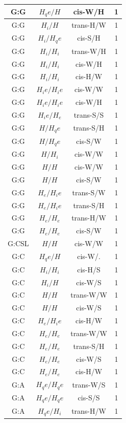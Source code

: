 \begin{center}
\begin{longtable}{c|c|c|c}
G:G & $H_qe/H$ & cis-W/H & 1 \\  \hline
G:G & $H_i/H$ & trans-H/W & 1 \\  \hline
G:G & $H_i/H_qe$ & cis-S/H & 1 \\  \hline
G:G & $H_i/H_i$ & trans-W/H & 1 \\  \hline
G:G & $H_i/H_i$ & cis-W/H & 1 \\  \hline
G:G & $H_i/H_i$ & cis-H/W & 1 \\  \hline
G:G & $H_ie/H_ie$ & cis-W/W & 1 \\  \hline
G:G & $H_ie/H_ie$ & cis-W/H & 1 \\  \hline
G:G & $H_ie/H_e$ & trans-S/S & 1 \\  \hline
G:G & $H/H_qe$ & trans-S/H & 1 \\  \hline
G:G & $H/H_qe$ & cis-S/W & 1 \\  \hline
G:G & $H/H_i$ & cis-W/W & 1 \\  \hline
G:G & $H/H$ & cis-W/W & 1 \\  \hline
G:G & $H/H$ & cis-S/W & 1 \\  \hline
G:G & $H_e/H_ie$ & trans-S/W & 1 \\  \hline
G:G & $H_e/H_ie$ & trans-S/H & 1 \\  \hline
G:G & $H_e/H_e$ & trans-H/W & 1 \\  \hline
G:G & $H_e/H_e$ & cis-S/W & 1 \\  \hline
G:CSL & $H/H$ & cis-W/W & 1 \\  \hline
G:C & $H_qe/H$ & cis-W/. & 1 \\  \hline
G:C & $H_i/H_i$ & cis-H/S & 1 \\  \hline
G:C & $H_i/H$ & cis-W/S & 1 \\  \hline
G:C & $H/H$ & trans-W/W & 1 \\  \hline
G:C & $H/H$ & cis-W/S & 1 \\  \hline
G:C & $H_e/H_ie$ & cis-H/W & 1 \\  \hline
G:C & $H_e/H_e$ & trans-W/W & 1 \\  \hline
G:C & $H_e/H_e$ & trans-S/H & 1 \\  \hline
G:C & $H_e/H_e$ & cis-W/S & 1 \\  \hline
G:C & $H_e/H_e$ & cis-H/W & 1 \\  \hline
G:A & $H_qe/H_qe$ & trans-W/S & 1 \\  \hline
G:A & $H_qe/H_qe$ & cis-S/S & 1 \\  \hline
G:A & $H_qe/H_i$ & trans-H/W & 1 \\  \hline

\end{longtable}
\end{center}
